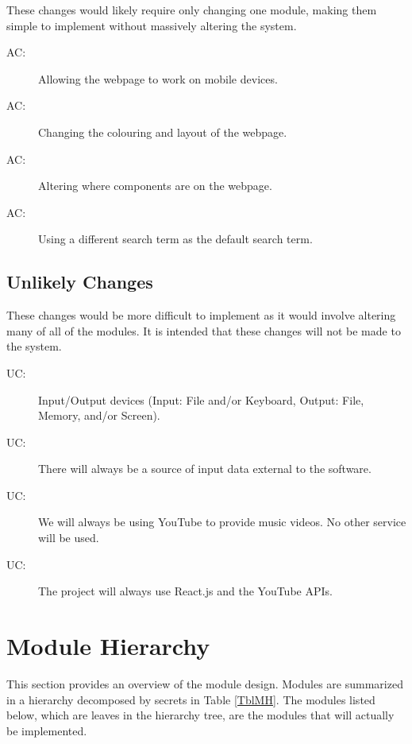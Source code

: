 \documentclass[12pt, titlepage]{article}
\newcounter{acnum}
\newcommand{\actheacnum}{AC\theacnum}
\newcounter{ucnum}
\newcommand{\uctheucnum}{UC\theucnum}
\begin{document}
\color{red}These changes would likely require only changing one module, making them simple to implement without massively altering the system. \color{black}

\begin{description}
\item[ \actheacnum \label{acHardware}:] Allowing the webpage to work on mobile devices.
\item[ \actheacnum \label{acDesign}:] Changing the colouring and layout of the webpage.
\item[ \actheacnum \label{acLayout}:] Altering where components are on the webpage.
\item[ \actheacnum \label{acDefaultSearch}:] Using a different search term as the default search term.
\end{description}

\subsection{Unlikely Changes} \label{SecUchange}

\color{red}These changes would be more difficult to implement as it would involve altering many of all of the modules.  It is intended that these changes will not be made to the system.\color{black}

\begin{description}
\item[ \uctheucnum \label{ucIO}:] Input/Output devices (Input: File and/or Keyboard, Output: File, Memory, and/or Screen).
\item[ \uctheucnum \label{ucInput}:] There will always be a source of input data external to the software.
\item[ \uctheucnum \label{ucService}:] We will always be using YouTube to provide music videos.  No other service will be used.
\item[ \uctheucnum \label{ucLibrary}:] The project will always use React.js and the YouTube APIs.
\end{description}

\section{Module Hierarchy} \label{SecMH}

This section provides an overview of the module design. Modules are summarized
in a hierarchy decomposed by secrets in Table \ref{TblMH}. The modules listed
below, which are leaves in the hierarchy tree, are the modules that will
actually be implemented.
\end{document}
